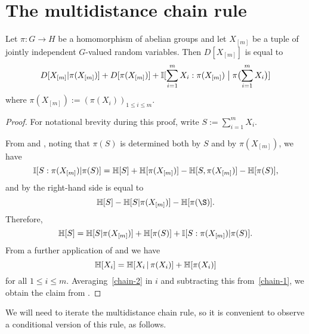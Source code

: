 \section{The multidistance chain rule}

\begin{lemma}\label{multidist-chain-rule}\leanok  Let $\pi \colon G \to H$ be a homomorphism of abelian groups and let $X_{[m]}$ be a tuple of jointly independent $G$-valued random variables.  Then $D[X_{[m]}]$ is equal to
  \begin{equation}
      D[ X_{[m]} | \pi(X_{[m]}) ]  +D[ \pi(X_{[m]}) ]  + \mathbb{I}[ \sum_{i=1}^m X_i  : \pi(X_{[m]}) \; \big| \; \pi\bigl(\sum_{i=1}^m X_i\bigr) ]
    \label{chain-eq}
  \end{equation}
  where $\pi(X_{[m]}) := (\pi(X_i))_{1 \leq i \leq m}$.
  \end{lemma}

  \begin{proof} For notational brevity during this proof, write $S := \sum_{i=1}^m X_i$.

    From  and , noting that $\pi(S)$ is determined both by $S$ and by $\pi(X_{[m]})$, we have
  \begin{equation*}
   \mathbb{I}[S:\pi(X_{[m]})|\pi(S)] = \mathbb{H}[S]+\mathbb{H}[\pi(X_{[m]})]-\mathbb{H}[S,\pi(X_{[m]})]-\mathbb{H}[\pi(S)],
  \end{equation*}
  and by  the right-hand side is equal to
  \begin{equation*}
  \bbH[S]-\bbH[S|\pi(X_{[m]})]-\bbH[\pi(\S)].
  \end{equation*}
  Therefore,
  \begin{equation}\label{chain-1}
  \mathbb{H}[S]=\mathbb{H}[S|\pi(X_{[m]})]+\mathbb{H}[\pi(S)]+\mathbb{I}[S:\pi(X_{[m]})|\pi(S)]. \end{equation}
  From a further application of  and  we have
  \begin{equation}\label{chain-2}
    \mathbb{H}[X_i] = \mathbb{H}[X_i \, | \, \pi(X_i)] + \mathbb{H}[\pi(X_i)]
  \end{equation}
  for all $1 \leq i \leq m$.  Averaging~\eqref{chain-2} in $i$ and subtracting this from~\eqref{chain-1}, we obtain the claim from .
  \end{proof}

  We will need to iterate the multidistance chain rule, so it is convenient to observe a conditional version of this rule, as follows.


